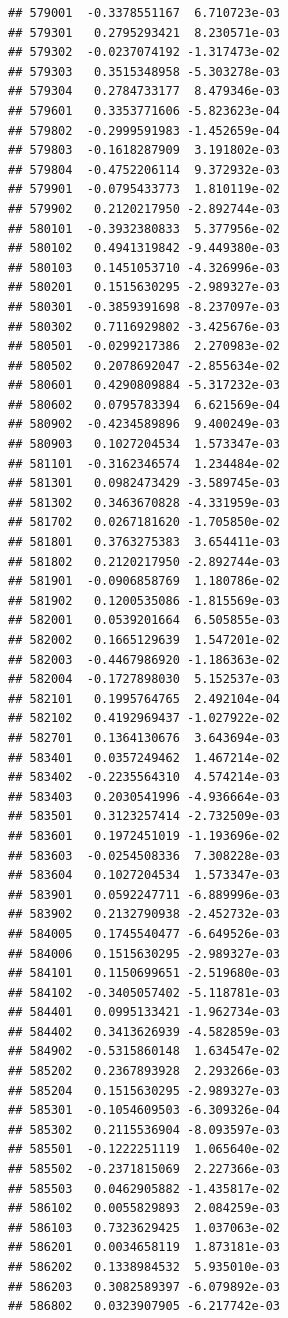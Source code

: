 \documentclass[ignorenonframetext,]{beamer}
\begin{document}
\begin{frame}[fragile]
\begin{verbatim}
## 579001  -0.3378551167  6.710723e-03
## 579301   0.2795293421  8.230571e-03
## 579302  -0.0237074192 -1.317473e-02
## 579303   0.3515348958 -5.303278e-03
## 579304   0.2784733177  8.479346e-03
## 579601   0.3353771606 -5.823623e-04
## 579802  -0.2999591983 -1.452659e-04
## 579803  -0.1618287909  3.191802e-03
## 579804  -0.4752206114  9.372932e-03
## 579901  -0.0795433773  1.810119e-02
## 579902   0.2120217950 -2.892744e-03
## 580101  -0.3932380833  5.377956e-02
## 580102   0.4941319842 -9.449380e-03
## 580103   0.1451053710 -4.326996e-03
## 580201   0.1515630295 -2.989327e-03
## 580301  -0.3859391698 -8.237097e-03
## 580302   0.7116929802 -3.425676e-03
## 580501  -0.0299217386  2.270983e-02
## 580502   0.2078692047 -2.855634e-02
## 580601   0.4290809884 -5.317232e-03
## 580602   0.0795783394  6.621569e-04
## 580902  -0.4234589896  9.400249e-03
## 580903   0.1027204534  1.573347e-03
## 581101  -0.3162346574  1.234484e-02
## 581301   0.0982473429 -3.589745e-03
## 581302   0.3463670828 -4.331959e-03
## 581702   0.0267181620 -1.705850e-02
## 581801   0.3763275383  3.654411e-03
## 581802   0.2120217950 -2.892744e-03
## 581901  -0.0906858769  1.180786e-02
## 581902   0.1200535086 -1.815569e-03
## 582001   0.0539201664  6.505855e-03
## 582002   0.1665129639  1.547201e-02
## 582003  -0.4467986920 -1.186363e-02
## 582004  -0.1727898030  5.152537e-03
## 582101   0.1995764765  2.492104e-04
## 582102   0.4192969437 -1.027922e-02
## 582701   0.1364130676  3.643694e-03
## 583401   0.0357249462  1.467214e-02
## 583402  -0.2235564310  4.574214e-03
## 583403   0.2030541996 -4.936664e-03
## 583501   0.3123257414 -2.732509e-03
## 583601   0.1972451019 -1.193696e-02
## 583603  -0.0254508336  7.308228e-03
## 583604   0.1027204534  1.573347e-03
## 583901   0.0592247711 -6.889996e-03
## 583902   0.2132790938 -2.452732e-03
## 584005   0.1745540477 -6.649526e-03
## 584006   0.1515630295 -2.989327e-03
## 584101   0.1150699651 -2.519680e-03
## 584102  -0.3405057402 -5.118781e-03
## 584401   0.0995133421 -1.962734e-03
## 584402   0.3413626939 -4.582859e-03
## 584902  -0.5315860148  1.634547e-02
## 585202   0.2367893928  2.293266e-03
## 585204   0.1515630295 -2.989327e-03
## 585301  -0.1054609503 -6.309326e-04
## 585302   0.2115536904 -8.093597e-03
## 585501  -0.1222251119  1.065640e-02
## 585502  -0.2371815069  2.227366e-03
## 585503   0.0462905882 -1.435817e-02
## 586102   0.0055829893  2.084259e-03
## 586103   0.7323629425  1.037063e-02
## 586201   0.0034658119  1.873181e-03
## 586202   0.1338984532  5.935010e-03
## 586203   0.3082589397 -6.079892e-03
## 586802   0.0323907905 -6.217742e-03

\end{verbatim}
\end{frame}
\end{document}
